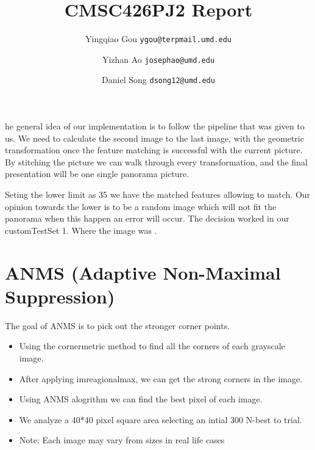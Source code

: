 \documentclass{CUP-JNL-PPS}
\begin{document}
\begin{Frontmatter}

\title[Panorama Report]{CMSC426PJ2 Report}
\author{Yingqiao Gou \texttt{ygou@terpmail.umd.edu}}
\author{Yizhan Ao \texttt{josephao@umd.edu}}
\author{Daniel Song \texttt{dsong12@umd.edu}}




\end{Frontmatter}


he general idea of our implementation is to follow the pipeline that was given to us. We need to calculate the second image to the last image, with the geometric transformation once the feature matching is successful with the current picture. By stitching the picture we can walk through every transformation, and the final presentation will be one single panorama picture. 

Seting the lower limit as 35 we have the matched features allowing to match. Our opinion towards the lower is to be a random image which will not fit the panorama when this happen an error will occur. The decision worked in our customTestSet 1. Where the image was
.

\section[]{ANMS (Adaptive Non-Maximal Suppression)}

The goal of ANMS is to pick out the stronger corner points.
\begin{itemize}
    \item Using the cornermetric method to find all the corners of each grayscale image. 
    \item After applying imreagionalmax, we can get the strong corners in the image.
    \item Using ANMS alogrithm we can find the best pixel of each image.
    \item We analyze a 40*40 pixel square area selecting an intial 300 N-best to trial.
    \item Note: Each image may vary from sizes in real life cases 
\end{itemize}
\end{document}
